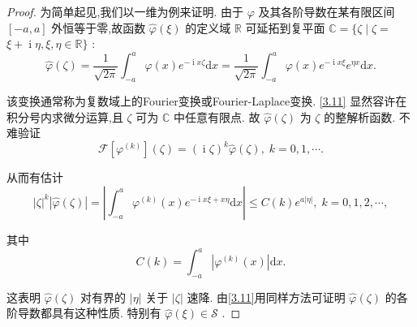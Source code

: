 \documentclass[lang=cn,newtx,10pt,scheme=chinese,thmcnt=chapter]{elegantbook}
\newcommand{\dif}{\mathrm{d}}
\newcommand{\ci}{\operatorname{i}}
\begin{document}
\begin{proof}
为简单起见,我们以一维为例来证明. 由于 \(\varphi\) 及其各阶导数在某有限区间 \(\left\lbrack  {-a,a}\right\rbrack\) 外恒等于零,故函数 \(\widehat{\varphi }\left( \xi \right)\) 的定义域 \(\mathbb{R}\) 可延拓到复平面 \(\mathbb{C} = \{ \zeta  \mid  \zeta  =\)  \(\xi  + {\ci\eta },\xi ,\eta  \in  \mathbb{R}\}\) :
\begin{equation}
\widehat{\varphi }\left( \zeta \right)  = \frac{1}{\sqrt{2\pi }}{\int }_{-a}^{a}\varphi \left( x\right) {e}^{-{\ci x\zeta }}{\dif x} = \frac{1}{\sqrt{2\pi }}{\int }_{-a}^{a}\varphi \left( x\right) {e}^{-{\ci x\xi }}{e}^{\eta x}{\dif x}. \label{3.11}
\end{equation}

该变换通常称为复数域上的Fourier变换或Fourier-Laplace变换. \ref{3.11} 显然容许在积分号内求微分运算,且 \(\zeta\) 可为 \(\mathbb{C}\) 中任意有限点. 故 \(\widehat{\varphi }\left( \zeta \right)\) 为 \(\zeta\) 的整解析函数. 不难验证
\begin{equation*}
\mathcal{F}\left\lbrack  {\varphi }^{\left( k\right) }\right\rbrack  \left( \zeta \right)  = {\left( \ci\zeta \right) }^{k}\widehat{\varphi }\left( \zeta \right) ,\;k = 0,1,\cdots .
\end{equation*}

从而有估计
\begin{equation}
{\left| \zeta \right| }^{k}\left| {\widehat{\varphi }\left( \zeta \right) }\right|  = \left| {{\int }_{-a}^{a}{\varphi }^{\left( k\right) }\left( x\right) {e}^{-{\ci x\xi } + {x\eta }}{\dif x}}\right|  \leqslant  C\left( k\right) {e}^{a\left| \eta \right| },\;k = 0,1,2,\cdots , \label{3.12}
\end{equation}

其中
\begin{equation*}
C\left( k\right)  = {\int }_{-a}^{a}\left| {{\varphi }^{\left( k\right) }\left( x\right) }\right| {\dif x}.
\end{equation*}

这表明 \(\widehat{\varphi }\left( \zeta \right)\) 对有界的 \(\left| \eta \right|\) 关于 \(\left| \zeta \right|\) 速降. 由\ref{3.11}用同样方法可证明 \(\widehat{\varphi }\left( \zeta \right)\) 的各阶导数都具有这种性质. 特别有 \(\widehat{\varphi }\left( \xi \right)  \in  \mathcal{S}\) .

\end{proof}
\end{document}
